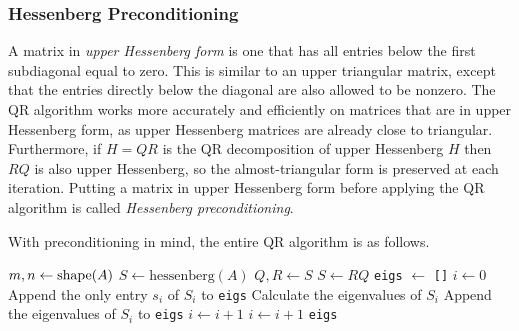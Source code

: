 \subsubsection*{Hessenberg Preconditioning} %

A matrix in \emph{upper Hessenberg form} is one that has all entries below the first subdiagonal equal to zero.
This is similar to an upper triangular matrix, except that the entries directly below the diagonal are also allowed to be nonzero.
The QR algorithm works more accurately and efficiently on matrices that are in upper Hessenberg form, as upper Hessenberg matrices are already close to triangular.
Furthermore, if $H = QR$ is the QR decomposition of upper Hessenberg $H$ then $RQ$ is also upper Hessenberg, so the almost-triangular form is preserved at each iteration.
Putting a matrix in upper Hessenberg form before applying the QR algorithm is called \emph{Hessenberg preconditioning}.


With preconditioning in mind, the entire QR algorithm is as follows.

\begin{algorithm}[H] %
\begin{algorithmic}[1]
    \State $m, n \gets \mathrm{shape}(A)$
    \State $S \gets \text{hessenberg}(A)$ \label{step:qr-alg-hessenberg}
     \label{step:qr-alg-niters}
        \State $Q, R \gets S$ \label{step:qr-alg-qr-S}
        \State $S \gets RQ$
    \EndFor
    \State \texttt{eigs} $\gets$ \texttt{[]}
    \State $i \gets 0$
         \label{step:qr-alg-S_i-1x1-or-2x2}
            \State Append the only entry $s_i$ of $S_i$ to \texttt{eigs}
            \State Calculate the eigenvalues of $S_i$
                \label{step:qr-alg-S_i-eigs}
            \State Append the eigenvalues of $S_i$ to \texttt{eigs}
            \State $i \gets i + 1$
        \EndIf
        \State $i \gets i + 1$
    \EndWhile
    \State {} \texttt{eigs}
\EndProcedure
\end{algorithmic}
\caption{}
\label{Alg:qr-algorithm}
\end{algorithm}

